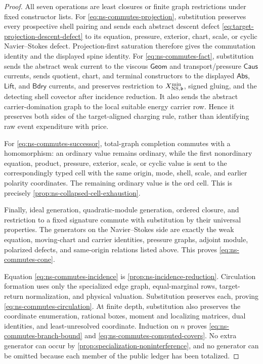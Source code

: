 \documentclass[11pt]{article}
\numberwithin{section}{part}
\theoremstyle{plain}
\theoremstyle{definition}
\theoremstyle{remark}
\newcommand{\Geom}{\mathsf{Geom}}
\newcommand{\Caus}{\mathsf{Caus}}
\newcommand{\Abs}{\mathsf{Abs}}
\newcommand{\Lift}{\mathsf{Lift}}
\newcommand{\Bdry}{\mathsf{Bdry}}
\begin{document}
\begin{proof}
All seven operations are least closures or finite graph restrictions under
fixed constructor lists.
For \eqref{eq:ns-commutes-projection}, substitution preserves every
prospective shell pairing and sends each abstract descent defect
\eqref{eq:target-projection-descent-defect} to its equation, pressure,
exterior, chart, scale, or cyclic Navier--Stokes defect.  Projection-first
saturation therefore gives the commutation identity and the displayed spine
identity.  For \eqref{eq:ns-commutes-fact}, substitution sends the abstract
weak current
to the viscous \(\Geom\) and transport/pressure \(\Caus\) currents, sends
quotient, chart, and terminal constructors to the displayed
\(\Abs\), \(\Lift\), and \(\Bdry\) currents, and preserves restriction to
\(X^{\min}_{{\rm NS},\mathfrak b}\), signed gluing, and the detecting shell
covector after incidence reduction.
It also sends the abstract carrier-domination graph to the local suitable
energy carrier row.  Hence it preserves both sides of the target-aligned
charging rule, rather than identifying raw event expenditure with price.

For \eqref{eq:ns-commutes-successor}, total-graph completion commutes with a
homomorphism: an ordinary value remains ordinary, while the first
nonordinary equation, product, pressure, exterior, scale, or cyclic value is
sent to the correspondingly typed cell with the same origin, mode, shell,
scale, and earlier polarity coordinates.  The remaining ordinary value is
the \(\mathrm{ord}\) cell.  This is precisely
\cref{prop:ns-collapsed-cell-exhaustion}.

Finally, ideal generation, quadratic-module generation, ordered closure, and
restriction to a fixed signature commute with substitution by their universal
properties.  The generators on the Navier--Stokes side are exactly the weak
equation, moving-chart and carrier identities, pressure graphs, adjoint
module, polarized defects, and same-origin relations listed above.  This
proves \eqref{eq:ns-commutes-cone}.

Equation \eqref{eq:ns-commutes-incidence} is
\cref{prop:ns-incidence-reduction}.  Circulation formation uses only the specialized edge graph, equal-marginal
rows, target-return normalization, and physical valuation.  Substitution
preserves each, proving \eqref{eq:ns-commutes-circulation}.  At finite depth,
substitution also preserves the coordinate enumeration, rational boxes,
moment and localizing matrices, dual identities, and least-unresolved
coordinate.  Induction on \(n\) proves
\eqref{eq:ns-commutes-branch-bound} and
\eqref{eq:ns-commutes-computed-covers}.  No extra generator can occur by
\cref{prop:specialization-noninterference}, and no generator can be omitted
because each member of the public ledger has been totalized.
\end{proof}
\end{document}
